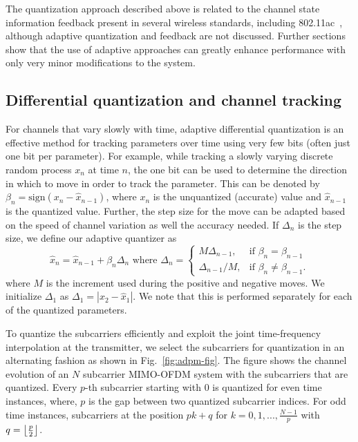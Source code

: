 \documentclass[journal,10pt,twocolumn]{IEEEtran}
\DeclarePairedDelimiter\floor{\lfloor}{\rfloor}
\begin{document}
The quantization approach described above is related to the channel
state information feedback present in several wireless standards,
including 802.11ac~\cite{lou2013comparison}, although adaptive
quantization and feedback are not discussed. Further
sections show that the use of adaptive approaches can greatly enhance
performance with only very minor modifications to the system.
\subsection{Differential quantization and channel tracking}
\label{quantiz}
For channels that vary slowly with time, adaptive differential
quantization is an effective method for tracking parameters over time
using very few bits (often just one bit per parameter). For example,
while tracking a slowly varying discrete random process $x_n$ at time
$n$, the one bit can be used to determine the direction in which to
move in order to track the parameter. This can be denoted by
$\beta_{n} = \mbox{sign}(x_{n} - \hat{x}_{n-1})$, where $x_n$ is the
unquantized (accurate) value and $\hat{x}_{n-1}$ is the quantized
value. Further, the step size for the move can be adapted based on the
speed of channel variation as well the accuracy needed. If $\Delta_n$
is the step size, we define our adaptive quantizer as
\begin{equation}
\hat{x}_{n} = \hat{x}_{n-1} + \beta_{n}\Delta_{n} \mbox{ where }
\label{delta_eqn}
\Delta_{n} = \begin{cases}
    M \Delta_{n-1}, & \text{if $\beta_{n} = \beta_{n-1}$}\\
    \Delta_{n-1}/M , & \text{if $\beta_{n} \neq \beta_{n-1}$}.
  \end{cases}
\end{equation}
where $M$ is the increment used during the positive and negative
moves. We initialize $\Delta_1$ as $\Delta_1 = |x_{2}-\hat{x}_1|$. We
note that this is performed separately for each of the quantized
parameters.

To quantize the subcarriers efficiently and exploit the joint
time-frequency interpolation at the transmitter, we select the
subcarriers for quantization in an alternating fashion as shown in
Fig.~\ref{fig:adpm-fig}. The figure shows the channel evolution of an
$N$ subcarrier MIMO-OFDM system with the subcarriers that are
quantized. Every $p$-th subcarrier starting with $0$ is quantized for
even time instances, where, $p$ is the gap between two quantized
subcarrier indices. For odd time instances, subcarriers at the
position $pk+q$ for $k = 0,1,..., \frac{N-1}{p}$ with $q =
{\floor*{\frac{p}{2}}}$.
\end{document}

